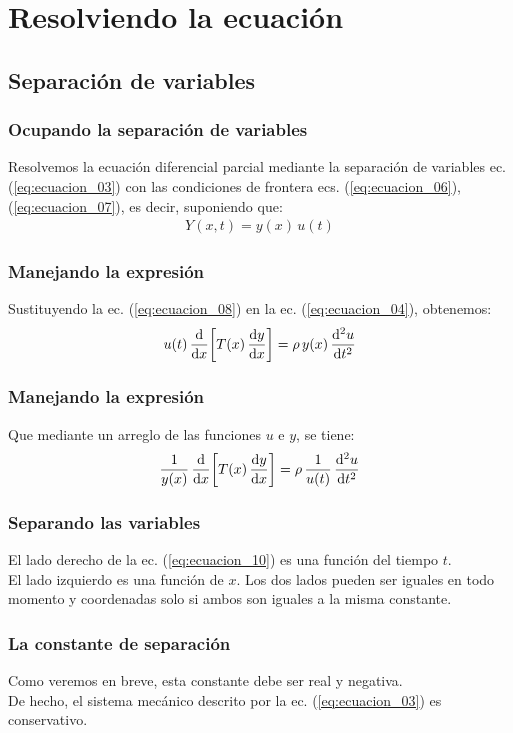\documentclass[12pt]{beamer}
\begin{document}
\section{Resolviendo la ecuación}
\subsection{Separación de variables}

\begin{frame}
\frametitle{Ocupando la separación de variables}
Resolvemos la ecuación diferencial parcial mediante la separación de variables ec. (\ref{eq:ecuacion_03}) con las condiciones de frontera ecs. (\ref{eq:ecuacion_06}), (\ref{eq:ecuacion_07}), es decir, suponiendo que:
\pause
\begin{align}
Y (x, t) = y (x) \, u (t)
\label{eq:ecuacion_08}
\end{align}
\end{frame}
\begin{frame}
\frametitle{Manejando la expresión}
Sustituyendo la ec. (\ref{eq:ecuacion_08}) en la ec. (\ref{eq:ecuacion_04}), obtenemos:
\pause
\begin{align}
u (t) \, \dv{x} \bigg[ T (x) \, \dv{y}{x} \bigg] = \rho \, y (x) \, \dv[2]{u}{t}
\label{eq:ecuacion_09}
\end{align}
\end{frame}
\begin{frame}
\frametitle{Manejando la expresión}
Que mediante un arreglo de las funciones $u$ e $y$, se tiene:
\pause
\begin{align}
\dfrac{1}{y (x)} \, \dv{x} \bigg[ T (x) \, \dv{y}{x} \bigg] = \rho \, \dfrac{1}{u (t)} \, \dv[2]{u}{t}
\label{eq:ecuacion_10}
\end{align}
\end{frame}
\begin{frame}
\frametitle{Separando las variables}
El lado derecho de la ec. (\ref{eq:ecuacion_10}) es una función del tiempo $t$.
\\
\bigskip
\pause
El lado izquierdo es una función de $x$. \pause Los dos lados pueden ser iguales en todo momento y coordenadas solo si ambos son iguales a la misma constante.
\end{frame}
\begin{frame}
\frametitle{La constante de separación}
Como veremos en breve, esta constante debe ser real y negativa.
\\
\bigskip
\pause
De hecho, el sistema mecánico descrito por la ec. (\ref{eq:ecuacion_03}) es conservativo.
\end{frame}
\end{document}
